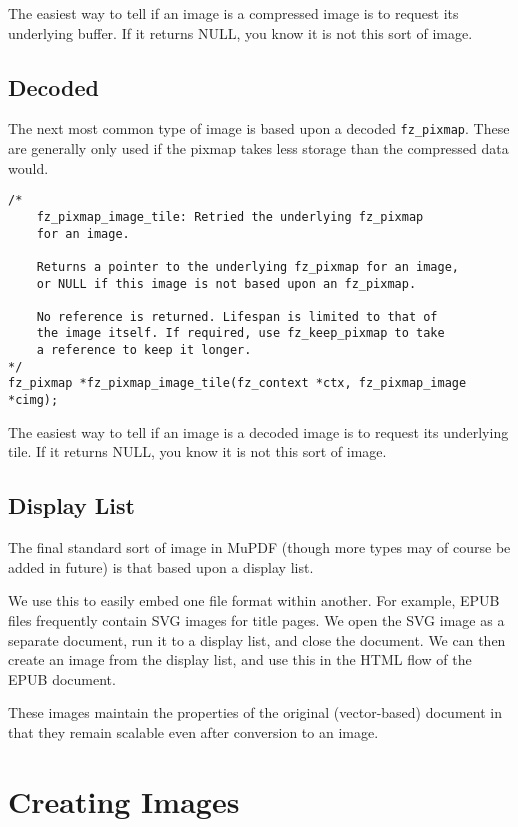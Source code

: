 \documentclass[oneside]{book}
\begin{document}
The easiest way to tell if an image is a compressed image is to request its underlying buffer. If it returns NULL, you know it is not this sort of image.

\subsection{Decoded}

The next most common type of image is based upon a decoded \texttt{fz\_pixmap}. These are generally only used if the pixmap takes less storage than the compressed data would.

\begin{lstlisting}
/*
	fz_pixmap_image_tile: Retried the underlying fz_pixmap
	for an image.

	Returns a pointer to the underlying fz_pixmap for an image,
	or NULL if this image is not based upon an fz_pixmap.

	No reference is returned. Lifespan is limited to that of
	the image itself. If required, use fz_keep_pixmap to take
	a reference to keep it longer.
*/
fz_pixmap *fz_pixmap_image_tile(fz_context *ctx, fz_pixmap_image *cimg);
\end{lstlisting}

The easiest way to tell if an image is a decoded image is to request its underlying tile. If it returns NULL, you know it is not this sort of image.

\subsection{Display List}

The final standard sort of image in MuPDF (though more types may of course be added in future) is that based upon a display list.

We use this to easily embed one file format within another. For example, EPUB files frequently contain SVG images for title pages. We open the SVG image as a separate document, run it to a display list, and close the document. We can then create an image from the display list, and use this in the HTML flow of the EPUB document.

These images maintain the properties of the original (vector-based) document in that they remain scalable even after conversion to an image.

\section{Creating Images}
\end{document}
